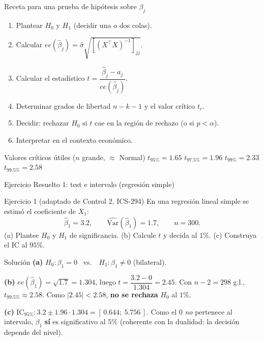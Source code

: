 \documentclass{beamer}
\begin{document}
\begin{frame}{Receta para una prueba de hipótesis sobre $\beta_j$}
\begin{enumerate}
    \item Plantear $H_0$ y $H_1$ (decidir una o dos colas).
    \item Calcular $ee(\hat{\beta}_j) = \hat{\sigma}\sqrt{[(X^{\top}X)^{-1}]_{jj}}$.
    \item Calcular el estadístico $t=\dfrac{\hat{\beta}_j - a_j}{ee(\hat{\beta}_j)}$.
    \item Determinar grados de libertad $n-k-1$ y el valor crítico $t_{c}$.
    \item Decidir: rechazar $H_0$ si $t$ cae en la región de rechazo (o si $p<\alpha$).
    \item Interpretar en el contexto económico.
\end{enumerate}

\begin{block}{Valores críticos útiles ($n$ grande, $\approx$ Normal)}
$t_{95\%}=1.65$ \quad $t_{97.5\%}=1.96$ \quad $t_{99\%}=2.33$ \quad $t_{99.5\%}=2.58$
\end{block}
\end{frame}

\begin{frame}{Ejercicio Resuelto 1: test e intervalo (regresión simple)}

\begin{block}{Ejercicio 1 \scriptsize (adaptado de Control 2, ICS-294)}
En una regresión lineal simple se estimó el coeficiente de $X_1$:
\[
\hat{\beta}_1 = 3.2, \qquad \widehat{\text{Var}}(\hat{\beta}_1)=1.7, \qquad n=300.
\]
(a) Plantee $H_0$ y $H_1$ de significancia. (b) Calcule $t$ y decida al $1\%$. (c) Construya el IC al $95\%$.
\end{block}

\pause

\begin{exampleblock}{Solución}
\textbf{(a)} $H_0:\beta_1 = 0$ \ vs.\ \ $H_1:\beta_1 \neq 0$ (bilateral).

\textbf{(b)} $ee(\hat{\beta}_1)=\sqrt{1.7}=1.304$, luego $t = \dfrac{3.2-0}{1.304}=2.45$. Con $n-2=298$ g.l., $t_{99.5\%}\approx 2.58$. Como $|2.45| < 2.58$, \textbf{no se rechaza} $H_0$ al $1\%$.

\textbf{(c)} $\text{IC}_{95\%}: 3.2 \pm 1.96\cdot 1.304 = [\,0.644;\ 5.756\,]$. Como el $0$ \emph{no} pertenece al intervalo, $\beta_1$ \textbf{sí} es significativo al $5\%$ (coherente con la dualidad: la decisión depende del nivel).
\end{exampleblock}

\end{frame}
\end{document}
